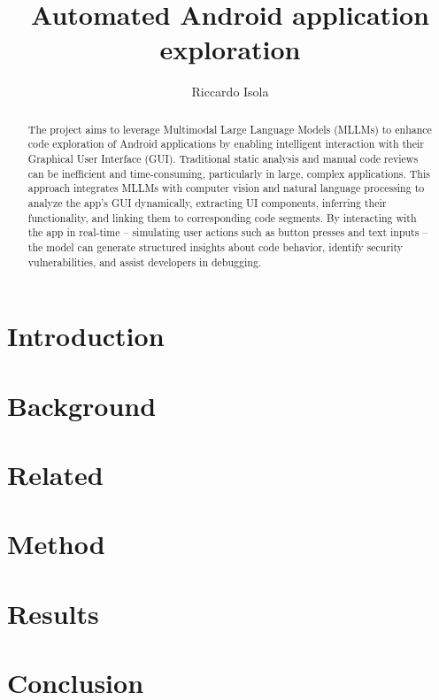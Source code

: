 \documentclass{masterthesis}
\begin{document}
\title{Automated Android application exploration}

\author{Riccardo Isola}



\maketitle

\begin{abstract}
The project aims to leverage Multimodal Large Language Models (MLLMs) to
enhance code exploration of Android applications by enabling intelligent
interaction with their Graphical User Interface (GUI). Traditional
static analysis and manual code reviews can be inefficient and
time-consuming, particularly in large, complex applications. This
approach integrates MLLMs with computer vision and natural language
processing to analyze the app's GUI dynamically, extracting UI
components, inferring their functionality, and linking them to
corresponding code segments. By interacting with the app in real-time --
simulating user actions such as button presses and text inputs -- the
model can generate structured insights about code behavior, identify
security vulnerabilities, and assist developers in debugging.
\end{abstract}

\tableofcontents


\chapter{Introduction}
\label{sec:introduction}



\chapter{Background}
\label{sec:background}



\chapter{Related}
\label{sec:related}



\chapter{Method}
\label{sec:method}



\chapter{Results}
\label{sec:results}



\chapter{Conclusion}
\label{sec:conclusion}



\printbibliography
% 
% 
\end{document}
